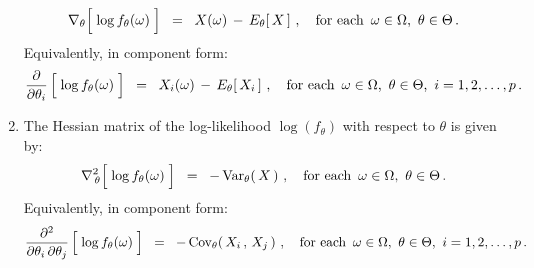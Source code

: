 \begin{theorem}
\begin{enumerate}
\begin{equation*}
	\nabla_{\theta}\!\left[\;\overset{{\color{white}.}}{\log}\,f_{\theta}(\omega)\;\right]
	\;\; = \;\;
		X(\omega) \, - \, E_{\theta}\!\left[\,X\,\right]\,,
	\quad
	\textnormal{for each \,$\omega\in\Omega$, \,$\theta\in\Theta$}\,.
	\end{equation*}	
	Equivalently, in component form:
	\begin{equation*}
	\dfrac{\partial}{\partial \theta_{i}}\left[\;\overset{{\color{white}.}}{\log}\,f_{\theta}(\omega)\;\right]
	\;\; = \;\;
		X_{i}(\omega) \, - \, E_{\theta}\!\left[\,X_{i}\,\right]\,,
	\quad
	\textnormal{for each \,$\omega\in\Omega$, \,$\theta\in\Theta$, \,$i = 1,2,\ldots,p$}\,.
	\end{equation*}	
\item\label{formulaHessianMatrix}
	The Hessian matrix of the log-likelihood $\log(f_{\theta})$ with respect to $\theta$ is given by:
	\begin{equation*}
	\Hess_{\,\theta}\!\left[\;\overset{{\color{white}.}}{\log}\,f_{\theta}(\omega)\;\right]
	\;\; = \;\;
		-\,\Var_{\theta}\!\left(\,X\,\right)\,,
	\quad
	\textnormal{for each \,$\omega\in\Omega$, \,$\theta\in\Theta$}\,.
	\end{equation*}	
	Equivalently, in component form:
	\begin{equation*}
	\dfrac{\partial^{2}}{\partial \theta_{i}\,\partial\theta_{j}}\left[\;\overset{{\color{white}.}}{\log}\,f_{\theta}(\omega)\;\right]
	\;\; = \;\;
		-\,\Cov_{\theta}\!\left(\,X_{i}\,,\,X_{j}\,\right)\,,
	\quad
	\textnormal{for each \,$\omega\in\Omega$, \,$\theta\in\Theta$, \,$i = 1,2,\ldots,p$}\,.
	\end{equation*}	
\end{enumerate}
\end{theorem}
\proof
